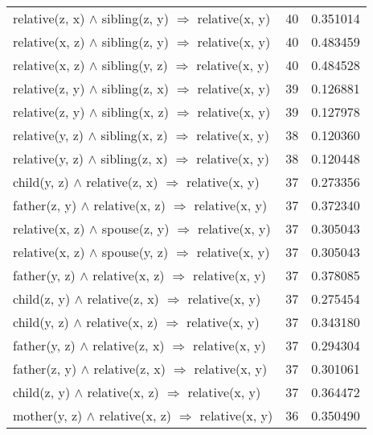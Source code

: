 \begin{longtable}{lrr}
 relative(z, x) $\wedge$ sibling(z, y)   $\Rightarrow$ relative(x, y) &           40 &        0.351014 \\
 relative(x, z) $\wedge$ sibling(z, y)   $\Rightarrow$ relative(x, y) &           40 &        0.483459 \\
 relative(x, z) $\wedge$ sibling(y, z)   $\Rightarrow$ relative(x, y) &           40 &        0.484528 \\
 relative(z, y) $\wedge$ sibling(z, x)   $\Rightarrow$ relative(x, y) &           39 &        0.126881 \\
 relative(z, y) $\wedge$ sibling(x, z)   $\Rightarrow$ relative(x, y) &           39 &        0.127978 \\
 relative(y, z) $\wedge$ sibling(x, z)   $\Rightarrow$ relative(x, y) &           38 &        0.120360 \\
 relative(y, z) $\wedge$ sibling(z, x)   $\Rightarrow$ relative(x, y) &           38 &        0.120448 \\
   child(y, z) $\wedge$ relative(z, x)   $\Rightarrow$ relative(x, y) &           37 &        0.273356 \\
  father(z, y) $\wedge$ relative(x, z)   $\Rightarrow$ relative(x, y) &           37 &        0.372340 \\
  relative(x, z) $\wedge$ spouse(z, y)   $\Rightarrow$ relative(x, y) &           37 &        0.305043 \\
  relative(x, z) $\wedge$ spouse(y, z)   $\Rightarrow$ relative(x, y) &           37 &        0.305043 \\
  father(y, z) $\wedge$ relative(x, z)   $\Rightarrow$ relative(x, y) &           37 &        0.378085 \\
   child(z, y) $\wedge$ relative(z, x)   $\Rightarrow$ relative(x, y) &           37 &        0.275454 \\
   child(y, z) $\wedge$ relative(x, z)   $\Rightarrow$ relative(x, y) &           37 &        0.343180 \\
  father(y, z) $\wedge$ relative(z, x)   $\Rightarrow$ relative(x, y) &           37 &        0.294304 \\
  father(z, y) $\wedge$ relative(z, x)   $\Rightarrow$ relative(x, y) &           37 &        0.301061 \\
   child(z, y) $\wedge$ relative(x, z)   $\Rightarrow$ relative(x, y) &           37 &        0.364472 \\
  mother(y, z) $\wedge$ relative(x, z)   $\Rightarrow$ relative(x, y) &           36 &        0.350490 \\

\end{longtable}
